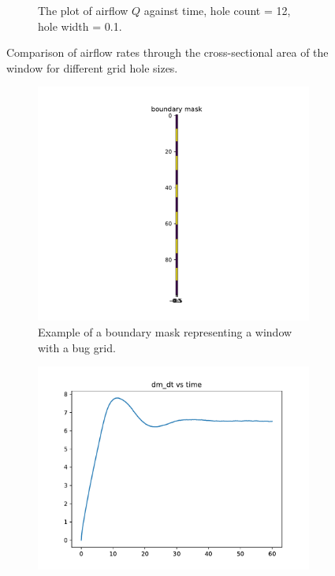 \begin{figure}[H]
\begin{subfigure}[b]{0.47\textwidth}
        \caption{The plot of airflow $Q$ against time, hole count = 12, hole width = 0.1.}
        \label{fig: flowrate2}
    \end{subfigure}
    \caption{Comparison of airflow rates through the cross-sectional area of the window for different grid hole sizes.}
    \label{fig: bound_plos_flowrate2}
\end{figure}

\begin{figure}[H]
    \centering
    \begin{subfigure}[b]{0.47\textwidth}
        \centering
        \includegraphics[width=\textwidth]{figures/bound_ex1.pdf}
        \caption{Example of a boundary mask representing a window with a bug grid.}
        \label{fig: bound3}
    \end{subfigure}
    \hfill
    \begin{subfigure}[b]{0.47\textwidth}
        \centering
        \includegraphics[width=\textwidth]{figures/dm_dt/log_holecount_7_holewidth_0.4_repeat_1.pdf}  %

\end{subfigure}
\end{figure}

